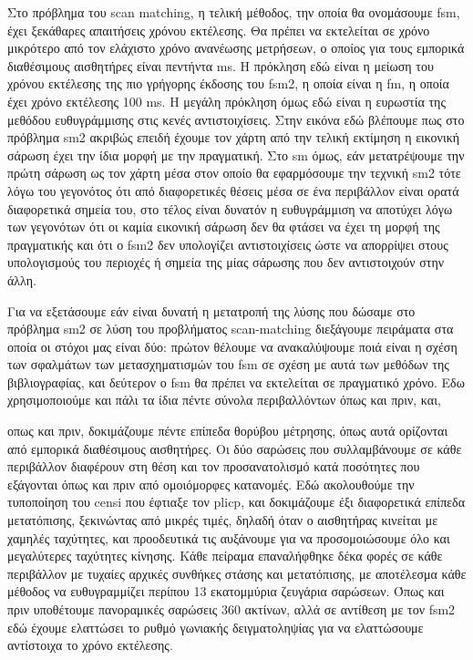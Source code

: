 \documentclass[a4paper,10pt]{article}
\begin{document}
Στο πρόβλημα του scan matching, η τελική μέθοδος, την οποία θα ονομάσουμε fsm,
έχει ξεκάθαρες απαιτήσεις χρόνου εκτέλεσης. Θα πρέπει να εκτελείται σε χρόνο
μικρότερο από τον ελάχιστο χρόνο ανανέωσης μετρήσεων, ο οποίος για τους
εμπορικά διαθέσιμους αισθητήρες είναι πεντήντα ms. Η πρόκληση εδώ είναι η
μείωση του χρόνου εκτέλεσης της πιο γρήγορης έκδοσης του fsm2, η οποία είναι η
fm, η οποία έχει χρόνο εκτέλεσης 100 ms.  Η μεγάλη πρόκληση όμως εδώ είναι η
ευρωστία της μεθόδου ευθυγράμμισης στις κενές αντιστοιχίσεις. Στην εικόνα εδώ
βλέπουμε πως στο πρόβλημα sm2 ακριβώς επειδή έχουμε τον χάρτη από την τελική
εκτίμηση η εικονική σάρωση έχει την ίδια μορφή με την πραγματική. Στο sm όμως,
εάν μετατρέψουμε την πρώτη σάρωση ως τον χάρτη μέσα στον οποίο θα εφαρμόσουμε
την τεχνική sm2 τότε λόγω του γεγονότος ότι από διαφορετικές θέσεις μέσα σε ένα
περιβάλλον είναι ορατά διαφορετικά σημεία του, στο τέλος είναι δυνατόν η
ευθυγράμμιση να αποτύχει λόγω των γεγονότων ότι οι καμία εικονική σάρωση δεν θα
φτάσει να έχει τη μορφή της πραγματικής και ότι ο fsm2 δεν υπολογίζει
αντιστοιχίσεις ώστε να απορρίψει στους υπολογισμούς του περιοχές ή σημεία της
μίας σάρωσης που δεν αντιστοιχούν στην άλλη.

Για να εξετάσουμε εάν είναι δυνατή η μετατροπή της λύσης που δώσαμε στο
πρόβλημα sm2 σε λύση του προβλήματος scan-matching διεξάγουμε πειράματα στα
οποία οι στόχοι μας είναι δύο: πρώτον θέλουμε να ανακαλύψουμε ποιά είναι η
σχέση των σφαλμάτων των μετασχηματισμών του fsm σε σχέση με αυτά των μεθόδων
της βιβλιογραφίας, και δεύτερον ο fsm θα πρέπει να εκτελείται σε πραγματικό
χρόνο. Εδω χρησιμοποιούμε και πάλι τα ίδια πέντε σύνολα περιβαλλόντων όπως και
πριν, και,

οπως και πριν, δοκιμάζουμε πέντε επίπεδα θορύβου μέτρησης, όπως αυτά ορίζονται
από εμπορικά διαθέσιμους αισθητήρες. Οι δύο σαρώσεις που συλλαμβάνουμε σε κάθε
περιβάλλον διαφέρουν στη θέση και τον προσανατολισμό κατά ποσότητες που
εξάγονται όπως και πριν από ομοιόμορφες κατανομές. Εδώ ακολουθούμε την
τυποποίηση του censi που έφτιαξε τον plicp, και δοκιμάζουμε έξι διαφορετικά
επίπεδα μετατόπισης, ξεκινώντας από μικρές τιμές, δηλαδή όταν ο αισθητήρας
κινείται με χαμηλές ταχύτητες, και προοδευτικά τις αυξάνουμε για να
προσομοιώσουμε όλο και μεγαλύτερες ταχύτητες κίνησης. Κάθε πείραμα επαναλήφθηκε
δέκα φορές σε κάθε περιβάλλον με τυχαίες αρχικές συνθήκες στάσης και
μετατόπισης, με αποτέλεσμα κάθε μέθοδος να ευθυγραμμίζει περίπου 13 εκατομμύρια
ζευγάρια σαρώσεων. Όπως και πριν υποθέτουμε πανοραμικές σαρώσεις 360 ακτίνων,
αλλά σε αντίθεση με τον fsm2 εδώ έχουμε ελαττώσει το ρυθμό γωνιακής
δειγματοληψίας για να ελαττώσουμε αντίστοιχα το χρόνο εκτέλεσης.
\end{document}
